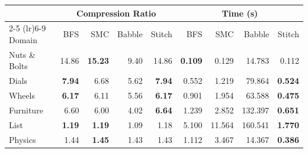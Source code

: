 \begin{tabular}{l rrrr|rrrr}
\toprule
& \multicolumn{4}{c|}{Compression Ratio} & \multicolumn{4}{c}{Time (s)} \\
\cmidrule(lr){2-5} \cmidrule(lr){6-9}
Domain & \cellcolor{estitchHighlight!9}BFS & \cellcolor{estitchHighlight!9}SMC & \cellcolor{ecorange!9}Babble & \cellcolor{ecblue!9}Stitch & \cellcolor{estitchHighlight!9}BFS & \cellcolor{estitchHighlight!9}SMC & \cellcolor{ecorange!9}Babble & \cellcolor{ecblue!9}Stitch \\
\midrule
Nuts \& Bolts & \cellcolor{estitchHighlight!9}14.86 & \cellcolor{estitchHighlight!9}\textbf{15.23} & \cellcolor{ecorange!9}9.40 & \cellcolor{ecblue!9}14.86 & \cellcolor{estitchHighlight!9}\textbf{0.109} & \cellcolor{estitchHighlight!9}0.129 & \cellcolor{ecorange!9}14.783 & \cellcolor{ecblue!9}0.112 \\
Dials & \cellcolor{estitchHighlight!9}\textbf{7.94} & \cellcolor{estitchHighlight!9}6.68 & \cellcolor{ecorange!9}5.62 & \cellcolor{ecblue!9}\textbf{7.94} & \cellcolor{estitchHighlight!9}0.552 & \cellcolor{estitchHighlight!9}1.219 & \cellcolor{ecorange!9}79.864 & \cellcolor{ecblue!9}\textbf{0.524} \\
Wheels & \cellcolor{estitchHighlight!9}\textbf{6.17} & \cellcolor{estitchHighlight!9}6.11 & \cellcolor{ecorange!9}5.56 & \cellcolor{ecblue!9}\textbf{6.17} & \cellcolor{estitchHighlight!9}0.901 & \cellcolor{estitchHighlight!9}1.954 & \cellcolor{ecorange!9}63.588 & \cellcolor{ecblue!9}\textbf{0.475} \\
Furniture & \cellcolor{estitchHighlight!9}6.60 & \cellcolor{estitchHighlight!9}6.00 & \cellcolor{ecorange!9}4.02 & \cellcolor{ecblue!9}\textbf{6.64} & \cellcolor{estitchHighlight!9}1.239 & \cellcolor{estitchHighlight!9}2.852 & \cellcolor{ecorange!9}132.397 & \cellcolor{ecblue!9}\textbf{0.651} \\
List & \cellcolor{estitchHighlight!9}\textbf{1.19} & \cellcolor{estitchHighlight!9}\textbf{1.19} & \cellcolor{ecorange!9}1.09 & \cellcolor{ecblue!9}1.18 & \cellcolor{estitchHighlight!9}5.100 & \cellcolor{estitchHighlight!9}11.564 & \cellcolor{ecorange!9}160.541 & \cellcolor{ecblue!9}\textbf{1.770} \\
Physics & \cellcolor{estitchHighlight!9}1.44 & \cellcolor{estitchHighlight!9}\textbf{1.45} & \cellcolor{ecorange!9}1.43 & \cellcolor{ecblue!9}1.43 & \cellcolor{estitchHighlight!9}1.112 & \cellcolor{estitchHighlight!9}3.467 & \cellcolor{ecorange!9}14.367 & \cellcolor{ecblue!9}\textbf{0.386} \\

\end{tabular}
